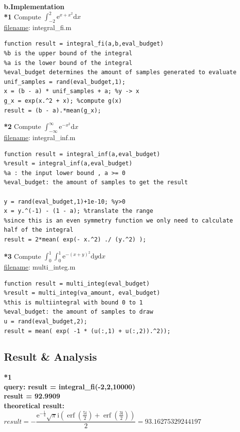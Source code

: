\documentclass[twoside]{article}
\begin{document}
\noindent \textbf {b.Implementation}\\
\noindent \textbf {*1}  Compute $\int_{-2}^{2}\mathrm{e}^{x+x^2}\mathrm{d}x$\\
\underline{filename}:  integral\_fi.m\\
\begin{lstlisting}
function result = integral_fi(a,b,eval_budget)
%b is the upper bound of the integral
%a is the lower bound of the integral
%eval_budget determines the amount of samples generated to evaluate
unif_samples = rand(eval_budget,1);
x = (b - a) * unif_samples + a; %y -> x
g_x = exp(x.^2 + x); %compute g(x)
result = (b - a).*mean(g_x);
\end{lstlisting}
\noindent \textbf {*2}  Compute $\int_{-\infty}^\infty\mathrm{e}^{-x^2}\mathrm{d}x$\\
\underline{filename}: integral\_inf.m\\
\begin{lstlisting}
function result = integral_inf(a,eval_budget)
%result = integral_inf(a,eval_budget)
%a : the input lower bound , a >= 0 
%eval_budget: the amount of samples to get the result 

y = rand(eval_budget,1)+1e-10; %y>0
x = y.^(-1) - (1 - a); %translate the range
%since this is an even symmetry function we only need to calculate half of the integral
result = 2*mean( exp(- x.^2) ./ (y.^2) ); 
\end{lstlisting} 
\noindent \textbf {*3}  Compute $\int_0^1\int_0^1\mathrm{e}^{-(x+y)^2}\mathrm{d}y\mathrm{d}x$\\
\underline{filename}: multi\_integ.m\\
\begin{lstlisting}
function result = multi_integ(eval_budget)
%result = multi_integ(va_amount, eval_budget)
%this is multiintegral with bound 0 to 1
%eval_budget: the amount of samples to draw
u = rand(eval_budget,2);
result = mean( exp( -1 * (u(:,1) + u(:,2)).^2));
\end{lstlisting}

\subsection{\normalsize{Result \& Analysis}}
\noindent \textbf {*1} \\
\noindent \textbf {query: result = integral\_fi(-2,2,10000) \\}
\noindent \textbf {result = 92.9909\\}
\noindent \textbf {theoretical result:\\
$result = -\dfrac{\mathrm{e}^{-\frac{1}{4}}\sqrt{{\pi}}\mathrm{i}\left(\operatorname{erf}\left(\frac{5\mathrm{i}}{2}\right)+\operatorname{erf}\left(\frac{3\mathrm{i}}{2}\right)\right)}{2}=93.16275329244197$}\\[10pt]
\end{document}
